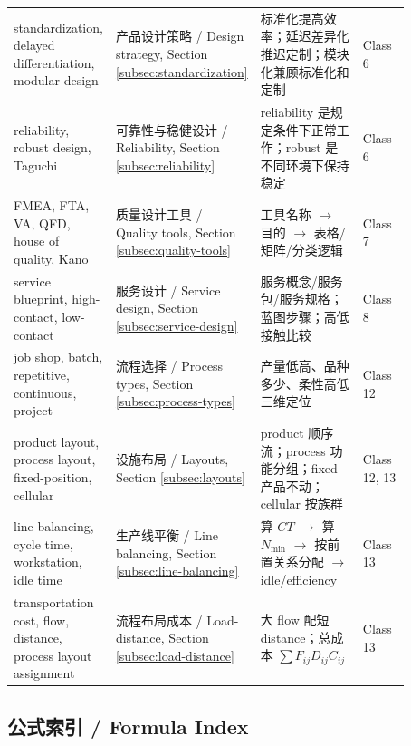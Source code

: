 \documentclass[10pt,a4paper]{ctexart}
\begin{document}
{\begin{longtable}{@{}L{0.17\linewidth}L{0.28\linewidth}L{0.29\linewidth}L{0.13\linewidth}@{}}
standardization, delayed differentiation, modular design & 产品设计策略 / Design strategy, Section \ref{subsec:standardization} & 标准化提高效率；延迟差异化推迟定制；模块化兼顾标准化和定制 & Class 6 \\
reliability, robust design, Taguchi & 可靠性与稳健设计 / Reliability, Section \ref{subsec:reliability} & reliability 是规定条件下正常工作；robust 是不同环境下保持稳定 & Class 6 \\
FMEA, FTA, VA, QFD, house of quality, Kano & 质量设计工具 / Quality tools, Section \ref{subsec:quality-tools} & 工具名称 $\rightarrow$ 目的 $\rightarrow$ 表格/矩阵/分类逻辑 & Class 7 \\
service blueprint, high-contact, low-contact & 服务设计 / Service design, Section \ref{subsec:service-design} & 服务概念/服务包/服务规格；蓝图步骤；高低接触比较 & Class 8 \\
job shop, batch, repetitive, continuous, project & 流程选择 / Process types, Section \ref{subsec:process-types} & 产量低高、品种多少、柔性高低三维定位 & Class 12 \\
product layout, process layout, fixed-position, cellular & 设施布局 / Layouts, Section \ref{subsec:layouts} & product 顺序流；process 功能分组；fixed 产品不动；cellular 按族群 & Class 12, 13 \\
line balancing, cycle time, workstation, idle time & 生产线平衡 / Line balancing, Section \ref{subsec:line-balancing} & 算 $CT$ $\rightarrow$ 算 $N_{\min}$ $\rightarrow$ 按前置关系分配 $\rightarrow$ idle/efficiency & Class 13 \\
transportation cost, flow, distance, process layout assignment & 流程布局成本 / Load-distance, Section \ref{subsec:load-distance} & 大 flow 配短 distance；总成本 $\sum F_{ij}D_{ij}C_{ij}$ & Class 13 \\
\bottomrule
\end{longtable}
}

\subsection{公式索引 / Formula Index}
\end{document}
